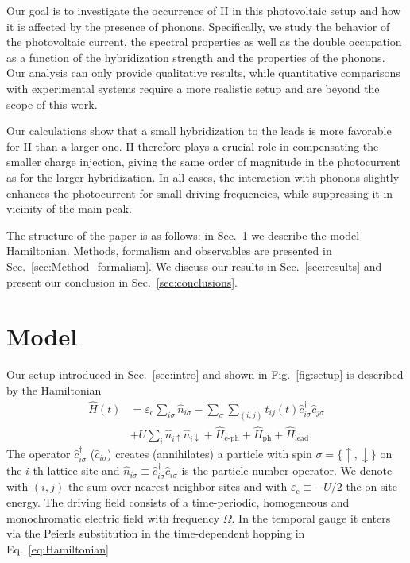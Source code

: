 \documentclass[aps,prb,groupedaddress,showpacs,twocolumn,superscriptaddress,10pt]{revtex4-2}
\begin{document}
Our goal is to investigate the occurrence of II in this photovoltaic setup and how it is affected by the presence of phonons. Specifically, we study the behavior of the photovoltaic current, the spectral properties as well as the double occupation as a function of the hybridization strength and the properties of the phonons. Our analysis can only provide qualitative results, while quantitative comparisons with experimental systems require a more realistic setup and are beyond the scope of this work.
 
Our calculations show that a small hybridization to the leads is more favorable for II than a larger one. II therefore plays a crucial role in compensating the smaller charge injection, giving the same order of magnitude in the photocurrent as for the larger hybridization.
In all cases, the interaction with phonons slightly enhances the photocurrent for small driving frequencies, while suppressing it in vicinity of the main peak.

The structure of the paper is as follows: in Sec.~\ref{sec:Model} we describe the model Hamiltonian. Methods, formalism and observables are presented in Sec.~\ref{sec:Method_formalism}. We discuss our results in Sec.~\ref{sec:results} and present our conclusion in Sec.~\ref{sec:conclusions}. 
 
  
\section{Model}
\label{sec:Model}

Our setup introduced in Sec.~\ref{sec:intro} and shown in Fig.~\ref{fig:setup} is described by the Hamiltonian
%
\begin{equation}
\label{eq:Hamiltonian}
\begin{split} 
\hat{H}(t)&=\varepsilon_{\text{c}} \sum_{i\sigma}\hat{n}_{i\sigma} -\sum_{\sigma}\sum_{(i,j)} t_{ij}(t) \hat{c}^{\dagger}_{i\sigma} \hat{c}_{j\sigma}
\\ & + U \sum_{i} \hat{n}_{i\uparrow} \hat{n}_{i\downarrow}+\hat{H}_{\text{e-ph}} + \hat{H}_{\text{ph}}+\hat{H}_{\text{lead}}.
\end{split}
\end{equation}
% 
The operator $\hat{c}^{\dagger}_{i\sigma}$ ($\hat{c}_{i\sigma}$) creates (annihilates) a particle with spin $\sigma= \lbrace \uparrow,\downarrow \rbrace$ on the $i$-th lattice site and $\hat{n}_{i\sigma}\equiv \hat{c}^{\dagger}_{i\sigma} \hat{c}_{i\sigma}$ is the particle number operator. We denote with $(i,j)$ the sum over nearest-neighbor sites and with $\varepsilon_{\text{c}} \equiv -U/2$ the on-site energy. The driving field consists of a time-periodic, homogeneous and monochromatic electric field with frequency $\Omega$. In the temporal gauge it enters via the Peierls substitution in the time-dependent hopping in Eq.~\eqref{eq:Hamiltonian}~\cite{peie.33}
\end{document}
